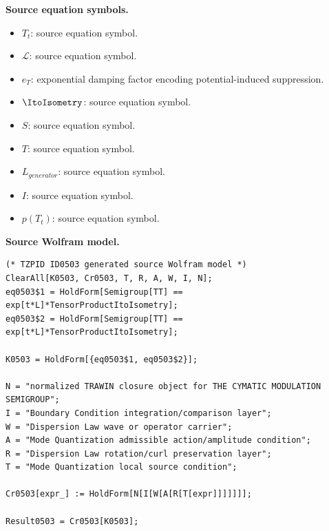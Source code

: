 \begin{minipage}[t]{0.49\linewidth}
\begingroup
\small
\raggedright
\textbf{Source equation symbols.}\par
\begin{itemize}[leftmargin=1.35em,itemsep=1pt,topsep=1pt,parsep=0pt]
    \item $T_t$: source equation symbol.
    \item $\mathcal{L}$: source equation symbol.
    \item $e_T$: exponential damping factor encoding potential-induced suppression.
    \item $\ItoIsometry$: source equation symbol.
    \item $S$: source equation symbol.
    \item $T$: source equation symbol.
    \item $L_{generator}$: source equation symbol.
    \item $I$: source equation symbol.
    \item $p(T_t)$: source equation symbol.
\end{itemize}
\endgroup
\end{minipage}\hfill
\begin{minipage}[t]{0.47\linewidth}
\begingroup
\scriptsize
\raggedright
\textbf{Source Wolfram model.}\par
\begin{Verbatim}[fontsize=\tiny,breaklines=true,breakanywhere=true]
(* TZPID ID0503 generated source Wolfram model *)
ClearAll[K0503, Cr0503, T, R, A, W, I, N];
eq0503$1 = HoldForm[Semigroup[TT] == exp[t*L]*TensorProductItoIsometry];
eq0503$2 = HoldForm[Semigroup[TT] == exp[t*L]*TensorProductItoIsometry];

K0503 = HoldForm[{eq0503$1, eq0503$2}];

N = "normalized TRAWIN closure object for THE CYMATIC MODULATION SEMIGROUP";
I = "Boundary Condition integration/comparison layer";
W = "Dispersion Law wave or operator carrier";
A = "Mode Quantization admissible action/amplitude condition";
R = "Dispersion Law rotation/curl preservation layer";
T = "Mode Quantization local source condition";

Cr0503[expr_] := HoldForm[N[I[W[A[R[T[expr]]]]]]];

Result0503 = Cr0503[K0503];
\end{Verbatim}
\endgroup
\end{minipage}

